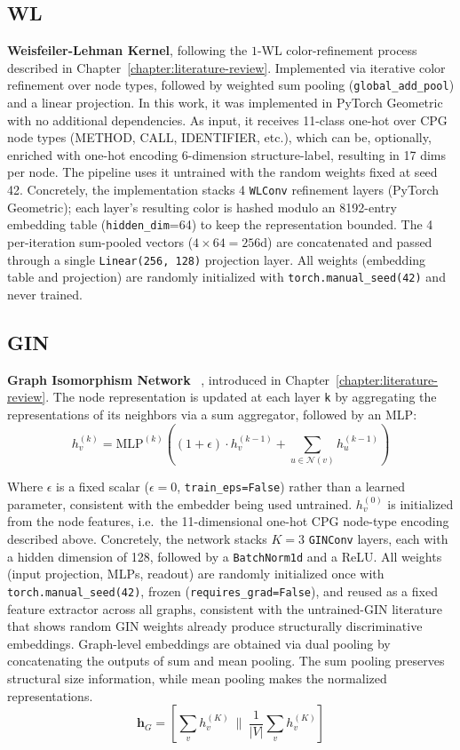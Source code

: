 \subsection{WL} 
\textbf{Weisfeiler-Lehman Kernel}, following the $1$-WL color-refinement process described in Chapter~\ref{chapter:literature-review}.
Implemented via iterative color refinement over node types, followed by weighted sum pooling (\texttt{global\_add\_pool}) and a linear projection. 
In this work, it was implemented in PyTorch Geometric with no additional dependencies. 
As input, it receives  11-class one-hot over CPG node types (METHOD, CALL, IDENTIFIER, etc.), which can be, optionally, enriched with one-hot encoding 6-dimension structure-label, resulting in 17 dims per node. The pipeline uses it untrained with the random weights fixed at seed 42.
Concretely, the implementation stacks 4 \texttt{WLConv} refinement layers (PyTorch Geometric); each layer's resulting color is hashed modulo an 8192-entry embedding table (\texttt{hidden\_dim}=64) to keep the representation bounded. 
The 4 per-iteration sum-pooled vectors ($4 \times 64 = 256$d) are concatenated and passed through a single \texttt{Linear(256, 128)} projection layer. 
All weights (embedding table and projection) are randomly initialized with \texttt{torch.manual\_seed(42)} and never trained.

\subsection{GIN} 
\textbf{Graph Isomorphism Network} ~\cite{xu2019gin}, introduced in Chapter~\ref{chapter:literature-review}.
The node representation is updated at each layer \texttt{k} by aggregating the representations of its neighbors via a sum aggregator, followed by an MLP:
$$h_v^{(k)} = \text{MLP}^{(k)}\!\left((1+\epsilon)\cdot h_v^{(k-1)} + \sum_{u \in \mathcal{N}(v)} h_u^{(k-1)}\right)$$

Where $\epsilon$ is a fixed scalar ($\epsilon = 0$, \texttt{train\_eps=False}) rather than a learned parameter, consistent with the embedder being used untrained.
$h_v^{(0)}$ is initialized  from the node features, i.e.\ the 11-dimensional one-hot CPG node-type encoding described above.
Concretely, the network stacks $K=3$ \texttt{GINConv} layers, each with a hidden dimension of 128, followed by a \texttt{BatchNorm1d} and a ReLU. All weights (input projection, MLPs, readout) are randomly initialized once with \texttt{torch.manual\_seed(42)}, frozen (\texttt{requires\_grad=False}), and reused as a fixed feature extractor across all graphs, consistent with the untrained-GIN literature that shows random GIN weights already produce structurally discriminative embeddings.
Graph-level embeddings are obtained via dual pooling by concatenating the outputs of sum and mean pooling. 
The sum pooling preserves structural size information, while mean pooling makes the normalized representations.
  $$\mathbf{h}_G = \left[\sum_{v} h_v^{(K)}\ \Big\|\ \frac{1}{|V|}\sum_{v} h_v^{(K)}\right]$$   
    
